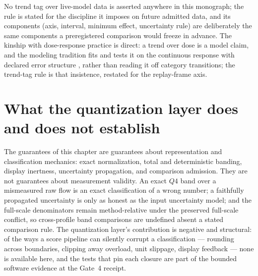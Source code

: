 No trend tag over live-model data is asserted anywhere in this monograph;
the rule is stated for the discipline it imposes on future admitted data,
and its components (axis, interval, minimum effect, uncertainty rule) are
deliberately the same components a preregistered comparison would freeze
in advance. The kinship with dose-response practice is direct: a trend
over dose is a model claim, and the modeling tradition fits and tests it
on the continuous response with declared error structure \cite{ritz},
rather than reading it off category transitions; the trend-tag
rule is that insistence, restated for the replay-frame axis.

\section{What the quantization layer does and does not establish}\label{ch08:sec:close}

\begin{boundary}\label{ch08:bound:scope}
The guarantees of this chapter are guarantees about representation and
classification mechanics: exact normalization, total and deterministic
banding, display inertness, uncertainty propagation, and comparison
admission. They are not guarantees about measurement validity. An exact
$Q4$ band over a mismeasured raw flow is an exact classification of a
wrong number; a faithfully propagated uncertainty is only as honest as
the input uncertainty model; and the full-scale denominators remain
method-relative under the preserved full-scale conflict, so cross-profile
band comparisons are undefined absent a stated comparison rule. The
quantization layer's contribution is negative and structural: of the ways
a score pipeline can silently corrupt a classification --- rounding across
boundaries, clipping away overload, unit slippage, display feedback ---
none is available here, and the tests that pin each closure are part of
the bounded software evidence at the Gate~4 receipt.
\end{boundary}
